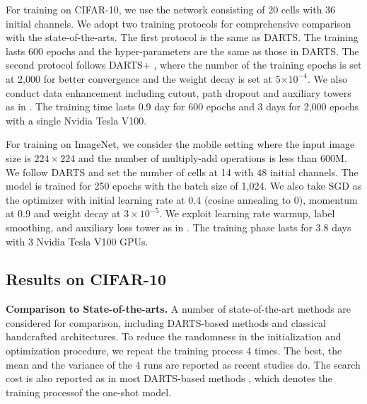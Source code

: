 \documentclass[journal]{IEEEtran}
\begin{document}
For training on CIFAR-10, we use the network consisting of 20 cells with 36 initial channels. We adopt two training protocols for comprehensive comparison with the state-of-the-arts. The first protocol is the same as DARTS. The training lasts 600 epochs and the hyper-parameters are the same as those in DARTS. The second protocol follows DARTS+ \cite {DBLP:journals/corr/abs-1909-06035}, where the number of the training epochs is set at 2,000 for better convergence and the weight decay is set at 5$\times 10^{-4}$. We also conduct data enhancement including cutout, path dropout and auxiliary towers as in \cite{DBLP:journals/corr/abs-1909-06035,DBLP:journals/corr/abs-1910-11831,DBLP:journals/corr/abs-1909-09656,DBLP:journals/corr/abs-1904-12760,DBLP:conf/iclr/LiuSY19}. The training time lasts 0.9 day for 600 epochs and 3 days for 2,000 epochs with a single Nvidia Tesla V100.  


For training on ImageNet, we consider the mobile setting where the input image size is $224\times 224$ and the number of multiply-add operations is less than 600M. We follow DARTS and set the number of cells at 14 with 48 initial channels. The model is trained for 250 epochs with the batch size of 1,024. We also take SGD as the optimizer with initial learning rate at 0.4 (cosine annealing to 0), momentum at 0.9 and weight decay at $3\times 10^{-5}$. We exploit learning rate warmup, label smoothing, and auxiliary loss tower as in \cite{DBLP:journals/corr/abs-1909-06035,DBLP:journals/corr/abs-1910-11831,DBLP:journals/corr/abs-1909-09656,DBLP:journals/corr/abs-1904-12760,DBLP:conf/iclr/LiuSY19}. The training phase lasts for 3.8 days with 3 Nvidia Tesla V100 GPUs. 



\subsection{Results on CIFAR-10}
\label{EXP.Res}
\textbf{Comparison to State-of-the-arts.} A number of state-of-the-art methods are considered for comparison, including DARTS-based methods and classical handcrafted architectures. To reduce the randomness in the initialization and optimization procedure, we repeat the training process 4 times. The best, the mean and the variance of the 4 runs are reported as recent studies do. The search cost is also reported as in most DARTS-based methods \cite{DBLP:conf/iclr/LiuSY19, DBLP:journals/corr/abs-1907-05737, DBLP:journals/corr/abs-1904-12760, DBLP:journals/corr/abs-1909-06035, DBLP:journals/corr/abs-1909-09656, DBLP:conf/iclr/Wang21, DBLP:journals/corr/abs-1910-11831}, which denotes the training processof the one-shot model. 
\end{document}
